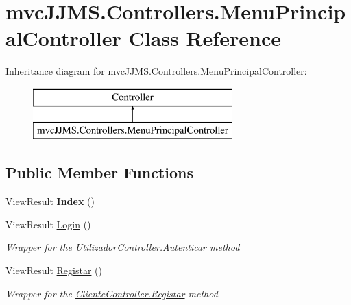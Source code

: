 \hypertarget{classmvc_j_j_m_s_1_1_controllers_1_1_menu_principal_controller}{}\section{mvc\+J\+J\+M\+S.\+Controllers.\+Menu\+Principal\+Controller Class Reference}
\label{classmvc_j_j_m_s_1_1_controllers_1_1_menu_principal_controller}
Inheritance diagram for mvc\+J\+J\+M\+S.\+Controllers.\+Menu\+Principal\+Controller\+:\begin{figure}[H]
\begin{center}
\leavevmode
\includegraphics[height=2.000000cm]{classmvc_j_j_m_s_1_1_controllers_1_1_menu_principal_controller}
\end{center}
\end{figure}
\subsection*{Public Member Functions}
\begin{DoxyCompactItemize}
\item 
\mbox{\label{classmvc_j_j_m_s_1_1_controllers_1_1_menu_principal_controller_a0e17d9e86a0a271c794b05910ab17af8}} 
View\+Result {\bfseries Index} ()
\item 
View\+Result \mbox{\hyperlink{classmvc_j_j_m_s_1_1_controllers_1_1_menu_principal_controller_aaa09d4cb83794cb17bdb5f9c7dffdd3d}{Login}} ()
\begin{DoxyCompactList}\small\item\em Wrapper for the \mbox{\hyperlink{classmvc_j_j_m_s_1_1_controllers_1_1_utilizador_controller_af5e72a30b41eb17d41cf14d3f0afd177}{Utilizador\+Controller.\+Autenticar}} method \end{DoxyCompactList}\item 
View\+Result \mbox{\hyperlink{classmvc_j_j_m_s_1_1_controllers_1_1_menu_principal_controller_a3ca7f041e21c6d3c633e255d96785d52}{Registar}} ()
\begin{DoxyCompactList}\small\item\em Wrapper for the \mbox{\hyperlink{classmvc_j_j_m_s_1_1_controllers_1_1_cliente_controller_a31325ea0231ffa6f09996a9f61f1731b}{Cliente\+Controller.\+Registar}} method \end{DoxyCompactList}\end{DoxyCompactItemize}


